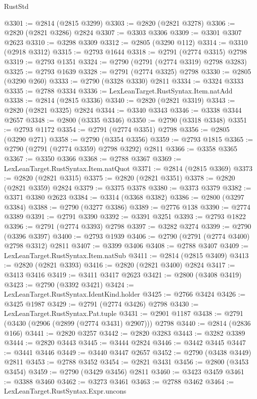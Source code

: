 \begin{lexlean}{RustStd}
\begin{coremodule}
@3301 := @2814 (@2815 @3299)
@3303 := @2820 (@2821 @3278)
@3306 := @2820 (@2821 @3286) @2824
@3307 := @3303 @3306
@3309 := @3301 @3307 @2623
@3310 := @3298 @3309
@3312 := @2805 (@3290 @112)
@3314 := @3310 (@2918 @3312)
@3315 := @2793 @1644
@3318 := @2791 (@2774 @3315) @2798
@3319 := @2793 @1351
@3324 := @2790 (@2791 (@2774 @3319) @2798 @3283)
@3325 := @2793 @1639
@3328 := @2791 (@2774 @3325) @2798
@3330 := @2805 (@3290 @260)
@3333 := @2790 (@3328 @3330) @2811
@3334 := @3324 @3333
@3335 := @2788 @3334
@3336 := LexLeanTarget.RustSyntax.Item.natAdd
@3338 := @2814 (@2815 @3336)
@3340 := @2820 (@2821 @3319)
@3343 := @2820 (@2821 @3325) @2824
@3344 := @3340 @3343
@3346 := @3338 @3344 @2657
@3348 := @2800 (@3335 @3346)
@3350 := @2790 (@3318 @3348)
@3351 := @2793 @1172
@3354 := @2791 (@2774 @3351) @2798
@3356 := @2805 (@3290 @271)
@3358 := @2790 (@3354 @3356)
@3359 := @2793 @1815
@3365 := @2790 (@2791 (@2774 @3359) @2798 @3292) @2811
@3366 := @3358 @3365
@3367 := @3350 @3366
@3368 := @2788 @3367
@3369 := LexLeanTarget.RustSyntax.Item.natQuot
@3371 := @2814 (@2815 @3369)
@3373 := @2820 (@2821 @3315)
@3375 := @2820 (@2821 @3351)
@3378 := @2820 (@2821 @3359) @2824
@3379 := @3375 @3378
@3380 := @3373 @3379
@3382 := @3371 @3380 @2623
@3384 := @3314 (@3368 @3382)
@3386 := @2800 (@3297 @3384)
@3388 := @2790 (@3277 @3386)
@3389 := @2776 @138
@3390 := @2774 @3389
@3391 := @2791 @3390
@3392 := @3391 @3251
@3393 := @2793 @1822
@3396 := @2791 (@2774 @3393) @2798
@3397 := @3282 @3274
@3399 := @2790 (@3396 @3397)
@3400 := @2793 @1939
@3406 := @2790 (@2791 (@2774 @3400) @2798 @3312) @2811
@3407 := @3399 @3406
@3408 := @2788 @3407
@3409 := LexLeanTarget.RustSyntax.Item.natSub
@3411 := @2814 (@2815 @3409)
@3413 := @2820 (@2821 @3393)
@3416 := @2820 (@2821 @3400) @2824
@3417 := @3413 @3416
@3419 := @3411 @3417 @2623
@3421 := @2800 (@3408 @3419)
@3423 := @2790 (@3392 @3421)
@3424 := LexLeanTarget.RustSyntax.IdentKind.holder
@3425 := @2766 @3424
@3426 := @3425 @1987
@3429 := @2791 (@2774 @3426) @2798
@3430 := LexLeanTarget.RustSyntax.Pat.tuple
@3431 := @2901 @1187
@3438 := @2791 (@3430 (@2906 (@2899 (@2774 @3431) @2907))) @2798
@3440 := @2814 (@2836 @166)
@3441 := @2820 @3257
@3442 := @2820 @3283
@3443 := @3282 @3389
@3444 := @2820 @3443
@3445 := @3444 @2824
@3446 := @3442 @3445
@3447 := @3441 @3446
@3449 := @3440 @3447 @2657
@3452 := @2790 (@3438 @3449) @2811
@3453 := @2788 @3452
@3454 := @2821 @3431
@3456 := @2800 (@3453 @3454)
@3459 := @2790 (@3429 @3456) @2811
@3460 := @3423 @3459
@3461 := @3388 @3460
@3462 := @3273 @3461
@3463 := @2788 @3462
@3464 := LexLeanTarget.RustSyntax.Expr.uncons

\end{coremodule}
\end{lexlean}
